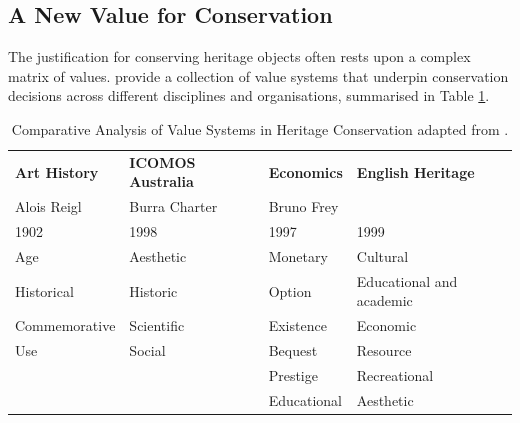 \subsection{A New Value for Conservation}

The justification for conserving heritage objects often rests upon a complex matrix of values. \textcite{avrami_values_2000} provide a collection of value systems that underpin conservation decisions across different disciplines and organisations, summarised in Table \ref{tab:values_comparison}.

\begin{table}[h]
    \footnotesize    
    \centering
    \resizebox{\textwidth}{!}
    {
        \begin{tabular}{llll}
            \toprule
            \textbf{Art History} & \textbf{ICOMOS Australia} & \textbf{Economics} & \textbf{English Heritage} \\
            Alois Reigl & Burra Charter & Bruno Frey &  \\ 
            1902 & 1998 & 1997 & 1999 \\ \hline
            Age & Aesthetic & Monetary & Cultural \\ 
            Historical & Historic & Option & Educational and academic \\ 
            Commemorative & Scientific & Existence & Economic \\ 
            Use & Social & Bequest & Resource \\ 
            & & Prestige & Recreational \\
            & & Educational & Aesthetic \\
            \bottomrule
        \end{tabular}
    }
    \caption{Comparative Analysis of Value Systems in Heritage Conservation adapted from \textcite{avrami_values_2000}.}
    \label{tab:values_comparison}
\end{table}

